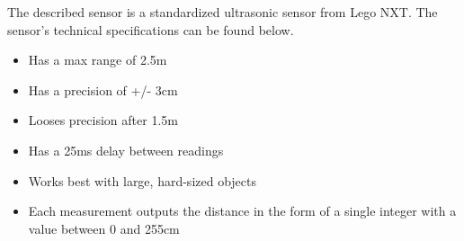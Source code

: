 
The described sensor is a standardized ultrasonic sensor from Lego NXT. The
sensor's technical specifications \citep{Ultrasonic_sensor} can be found below.
\begin{itemize}
  \item Has a max range of 2.5m
  \item Has a precision of +/- 3cm
  \item Looses precision after 1.5m
  \item Has a 25ms delay between readings
  \item Works best with large, hard-sized objects
  \item Each measurement outputs the distance in the form of a single integer
  with a value between 0 and 255cm
\end{itemize}

% 













